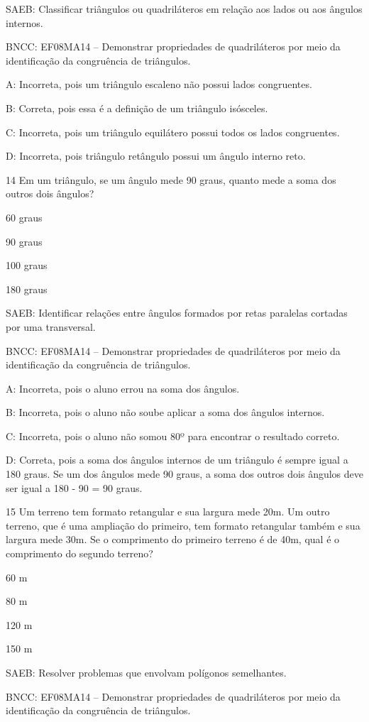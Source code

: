 {SAEB: Classificar triângulos ou quadriláteros em relação aos lados ou
aos ângulos internos.

BNCC: EF08MA14 -- Demonstrar propriedades de quadriláteros por meio da
identificação da congruência de triângulos.

A: Incorreta, pois um triângulo escaleno não possui lados congruentes.

B: Correta, pois essa é a definição de um triângulo isósceles.

C: Incorreta, pois um triângulo equilátero possui todos os lados
congruentes.

D: Incorreta, pois triângulo retângulo possui um ângulo interno reto.

\num{14} Em um triângulo, se um ângulo mede 90 graus, quanto mede a soma dos
outros dois ângulos?
\item 60 graus
\item 90 graus
\item 100 graus
\item 180 graus

SAEB: Identificar relações entre ângulos formados por retas paralelas
cortadas por uma transversal.

BNCC: EF08MA14 -- Demonstrar propriedades de quadriláteros por meio da
identificação da congruência de triângulos.

A: Incorreta, pois o aluno errou na soma dos ângulos.

B: Incorreta, pois o aluno não soube aplicar a soma dos ângulos
internos.

C: Incorreta, pois o aluno não somou 80º para encontrar o resultado
correto.

D: Correta, pois a soma dos ângulos internos de um triângulo é sempre
igual a 180 graus. Se um dos ângulos mede 90 graus, a soma dos outros
dois ângulos deve ser igual a 180 - 90 = 90 graus.

\num{15} Um terreno tem formato retangular e sua largura mede 20m. Um outro
terreno, que é uma ampliação do primeiro, tem formato retangular também
e sua largura mede 30m. Se o comprimento do primeiro terreno é de 40m,
qual é o comprimento do segundo terreno?
\item 60 m
\item 80 m
\item 120 m
\item 150 m

SAEB: Resolver problemas que envolvam polígonos semelhantes.

BNCC: EF08MA14 -- Demonstrar propriedades de quadriláteros por meio da
identificação da congruência de triângulos.

}
